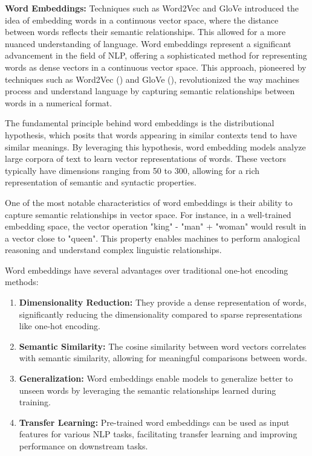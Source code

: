 \textbf{Word Embeddings:} Techniques such as Word2Vec and GloVe introduced the idea of embedding words in a continuous vector space, where the distance between words reflects their semantic relationships. This allowed for a more nuanced understanding of language. Word embeddings represent a significant advancement in the field of NLP, offering a sophisticated method for representing words as dense vectors in a continuous vector space. This approach, pioneered by techniques such as Word2Vec (\cite{mikolov2013efficient}) and GloVe (\cite{pennington2014glove}), revolutionized the way machines process and understand language by capturing semantic relationships between words in a numerical format.

The fundamental principle behind word embeddings is the distributional hypothesis, which posits that words appearing in similar contexts tend to have similar meanings. By leveraging this hypothesis, word embedding models analyze large corpora of text to learn vector representations of words. These vectors typically have dimensions ranging from 50 to 300, allowing for a rich representation of semantic and syntactic properties.

One of the most notable characteristics of word embeddings is their ability to capture semantic relationships in vector space. For instance, in a well-trained embedding space, the vector operation "king" - "man" + "woman" would result in a vector close to "queen". This property enables machines to perform analogical reasoning and understand complex linguistic relationships.

Word embeddings have several advantages over traditional one-hot encoding methods:
\begin{enumerate}
    \item \textbf{Dimensionality Reduction:} They provide a dense representation of words, significantly reducing the dimensionality compared to sparse representations like one-hot encoding.
    \item \textbf{Semantic Similarity:} The cosine similarity between word vectors correlates with semantic similarity, allowing for meaningful comparisons between words.
    \item \textbf{Generalization:} Word embeddings enable models to generalize better to unseen words by leveraging the semantic relationships learned during training.
    \item \textbf{Transfer Learning:} Pre-trained word embeddings can be used as input features for various NLP tasks, facilitating transfer learning and improving performance on downstream tasks.
\end{enumerate}

